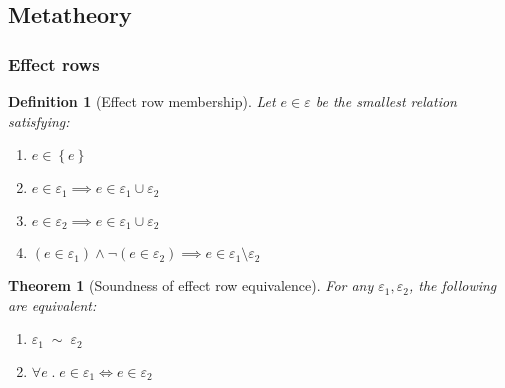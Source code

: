 \documentclass[12pt]{article}
\newtheorem{definition}{Definition}
\newtheorem{theorem}{Theorem}
\newcommand\parens[1]{\left( #1 \right)}
\newcommand\row{\varepsilon}
\newcommand\rsingleton[1]{\left\{ #1 \right\}}
\newcommand\runion[2]{#1 \cup #2}
\newcommand\rdiff[2]{#1 \setminus #2}
\newcommand\effect{e}
\newcommand\requiv[2]{#1 \; \sim \; #2}
\begin{document}
    \subsection{Metatheory}

      \subsubsection{Effect rows}

        \begin{definition}[Effect row membership]
          Let $\effect \in \row$ be the smallest relation satisfying:
          \begin{enumerate}
            \item $\effect \in \rsingleton{\effect}$
            \item $\effect \in \row_1 \implies \effect \in \runion{\row_1}{\row_2}$
            \item $\effect \in \row_2 \implies \effect \in \runion{\row_1}{\row_2}$
            \item $\parens{\effect \in \row_1} \wedge \neg \parens{\effect \in \row_2} \implies \effect \in \rdiff{\row_1}{\row_2}$
          \end{enumerate}
        \end{definition}

        \begin{theorem}[Soundness of effect row equivalence]
          For any $\row_1, \row_2$, the following are equivalent:
          \begin{enumerate}
            \item $\requiv{\row_1}{\row_2}$
            \item $\forall \effect \;.\; \effect \in \row_1 \iff \effect \in \row_2$
          \end{enumerate}
        \end{theorem}
\end{document}
